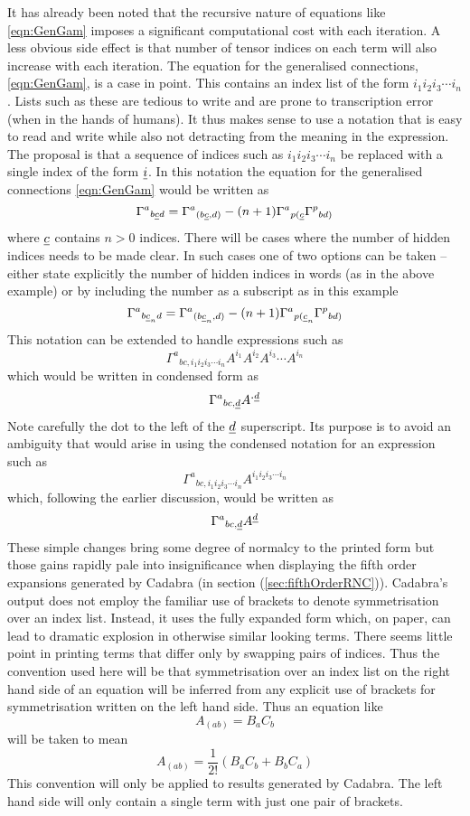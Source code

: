 \documentclass[a4paper,12pt]{article}
\numberwithin{equation}{section}
\begin{document}
It has already been noted that the recursive nature of equations like \eqref{eqn:GenGam}
imposes a significant computational cost with each iteration. A less obvious side effect is
that number of tensor indices on each term will also increase with each iteration. The
equation for the generalised connections, \eqref{eqn:GenGam}, is a case in point. This
contains an index list of the form $i_1i_2i_3\cdots i_n$. Lists such as these are tedious to
write and are prone to transcription error (when in the hands of humans). It thus makes sense
to use a notation that is easy to read and write while also not detracting from the meaning
in the expression. The proposal is that a sequence of indices such as $i_1i_2i_3\cdots i_n$
be replaced with a single index of the form $\ui$. In this notation the equation for the
generalised connections \eqref{eqn:GenGam} would be written as
\[
\Gamma^{a}{}_{b\uc d} = \Gamma^{a}{}_{(b\uc,d)}
                - (n+1) \Gamma^{a}{}_{p(\uc}
                        \Gamma^{p}{}_{bd)}
\]
where $\uc$ contains $n>0$ indices. There will be cases where the number of hidden indices
needs to be made clear. In such cases one of two options can be taken -- either state
explicitly the number of hidden indices in words (as in the above example) or by including
the number as a subscript as in this example
\[
\Gamma^{a}{}_{b\uc_n d} = \Gamma^{a}{}_{(b\uc_n,d)}
                  - (n+1) \Gamma^{a}{}_{p(\uc_n}
                          \Gamma^{p}{}_{bd)}
\]
This notation can be extended to handle expressions such as
\[
\Gamma^a{}_{bc,i_1i_2i_3\cdots i_n}A^{i_1}A^{i_2}A^{i_3}\cdots A^{i_n}
\]
which would be written in condensed form as
\[
\Gamma^a{}_{bc,\ud}A^{\Xdot\ud}
\]
Note carefully the dot to the left of the $\ud$ superscript. Its purpose is to avoid an
ambiguity that would arise in using the condensed notation for an expression such as
\[
\Gamma^a{}_{bc,i_1i_2i_3\cdots i_n}A^{i_1i_2i_3\cdots i_n}
\]
which, following the earlier discussion, would be written as
\[
\Gamma^a{}_{bc,\ud}A^{\ud}
\]
These simple changes bring some degree of normalcy to the printed form but those gains
rapidly pale into insignificance when displaying the fifth order expansions generated by
Cadabra (in section (\ref{sec:fifthOrderRNC})). Cadabra's output does not employ the
familiar use of brackets to denote symmetrisation over an index list. Instead, it uses the
fully expanded form which, on paper, can lead to dramatic explosion in otherwise similar
looking terms. There seems little point in printing terms that differ only by swapping pairs
of indices. Thus the convention used here will be that symmetrisation over an index list on
the right hand side of an equation will be inferred from any explicit use of brackets for
symmetrisation written on the left hand side. Thus an equation like
\[
A_{(ab)} = B_a C_b
\]
will be taken to mean
\[
A_{(ab)} = \frac{1}{2!}\left (B_a C_b + B_b C_a\right)
\]
This convention will only be applied to results generated by Cadabra. The left hand side
will only contain a single term with just one pair of brackets.
\end{document}
